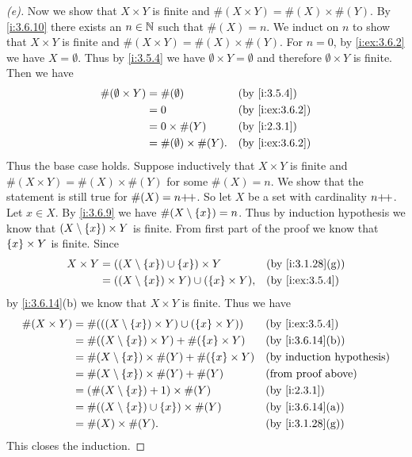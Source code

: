 \begin{proof}[(e)]
  Now we show that \(X \times Y\) is finite and \(\#(X \times Y) = \#(X) \times \#(Y)\).
  By \cref{i:3.6.10} there exists an \(n \in \mathbb{N}\) such that \(\#(X) = n\).
  We induct on \(n\) to show that \(X \times Y\) is finite and \(\#(X \times Y) = \#(X) \times \#(Y)\).
  For \(n = 0\), by \cref{i:ex:3.6.2} we have \(X = \emptyset\).
  Thus by \cref{i:3.5.4} we have \(\emptyset \times Y = \emptyset\) and therefore \(\emptyset \times Y\) is finite.
  Then we have
  \begin{align*}
    \#(\emptyset \times Y) & = \#(\emptyset)               &  & \by{i:3.5.4}    \\
                           & = 0                           &  & \by{i:ex:3.6.2} \\
                           & = 0 \times \#(Y)              &  & \by{i:2.3.1}    \\
                           & = \#(\emptyset) \times \#(Y). &  & \by{i:ex:3.6.2}
  \end{align*}
  Thus the base case holds.
  Suppose inductively that \(X \times Y\) is finite and \(\#(X \times Y) = \#(X) \times \#(Y)\) for some \(\#(X) = n\).
  We show that the statement is still true for \(\#(X) = n{+}\!{+}\).
  So let \(X\) be a set with cardinality \(n{+}\!{+}\).
  Let \(x \in X\).
  By \cref{i:3.6.9} we have \(\#(X \setminus \left\lbrace x\right\rbrace) = n\).
  Thus by induction hypothesis we know that \((X \setminus \left\lbrace x\right\rbrace) \times Y\) is finite.
  From first part of the proof we know that \(\left\lbrace x\right\rbrace \times Y\) is finite.
  Since
  \begin{align*}
    X \times Y & = ((X \setminus \set{x}) \cup \set{x}) \times Y             &  & \by{i:3.1.28}[g] \\
               & = ((X \setminus \set{x}) \times Y) \cup (\set{x} \times Y), &  & \by{i:ex:3.5.4}
  \end{align*}
  by \cref{i:3.6.14}(b) we know that \(X \times Y\) is finite.
  Thus we have
  \begin{align*}
    \#(X \times Y) & = \#(((X \setminus \set{x}) \times Y) \cup (\set{x} \times Y)) &  & \by{i:ex:3.5.4}           \\
                   & = \#((X \setminus \set{x}) \times Y) + \#(\set{x} \times Y)    &  & \by{i:3.6.14}[b]          \\
                   & = \#(X \setminus \set{x}) \times \#(Y) + \#(\set{x} \times Y)  &  & \byIH                     \\
                   & = \#(X \setminus \set{x}) \times \#(Y) + \#(Y)                 &  & \text{(from proof above)} \\
                   & = (\#(X \setminus \set{x}) + 1) \times \#(Y)                   &  & \by{i:2.3.1}              \\
                   & = \#((X \setminus \set{x}) \cup \set{x}) \times \#(Y)          &  & \by{i:3.6.14}[a]          \\
                   & = \#(X) \times \#(Y).                                          &  & \by{i:3.1.28}[g]
  \end{align*}
  This closes the induction.
\end{proof}

